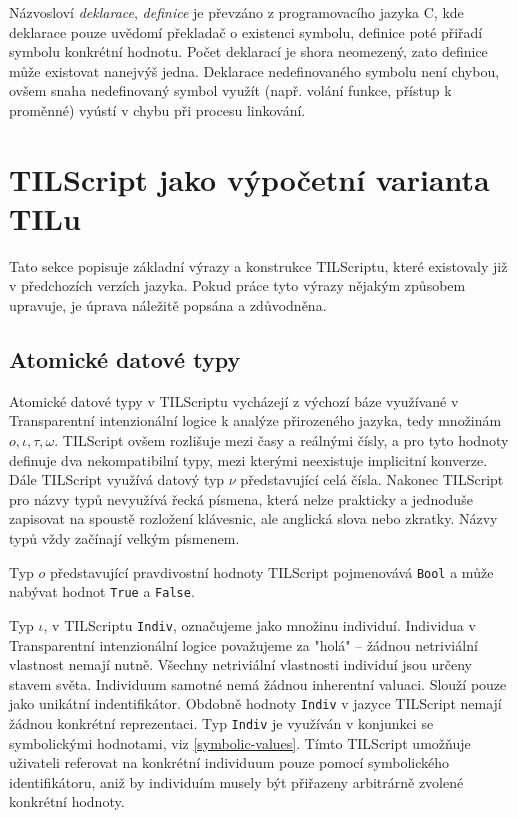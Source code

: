 Názvosloví \textit{deklarace}, \textit{definice} je převzáno z programovacího jazyka C, kde
deklarace pouze uvědomí překladač o existenci symbolu, definice poté přiřadí symbolu konkrétní
hodnotu. Počet deklarací je shora neomezený, zato definice může existovat nanejvýš jedna. Deklarace
nedefinovaného symbolu není chybou, ovšem snaha nedefinovaný symbol využít (např. volání funkce,
přístup k proměnné) vyústí v chybu při procesu linkování.

\section{TILScript jako výpočetní varianta TILu}

Tato sekce popisuje základní výrazy a konstrukce TILScriptu, které existovaly již v předchozích
verzích jazyka. Pokud práce tyto výrazy nějakým způsobem upravuje, je úprava náležitě popsána
a zdůvodněna.

\subsection{Atomické datové typy}

Atomické datové typy v TILScriptu vycházejí z výchozí báze využívané v Transparentní intenzionální
logice k analýze přirozeného jazyka, tedy množinám ${o, \iota, \tau, \omega}$. TILScript ovšem
rozlišuje mezi časy a reálnými čísly, a pro tyto hodnoty definuje dva nekompatibilní typy, mezi
kterými neexistuje implicitní konverze. Dále TILScript využívá datový typ $\nu$ představující celá
čísla. Nakonec TILScript pro názvy typů nevyužívá řecká písmena, která nelze prakticky a jednoduše
zapisovat na spoustě rozložení klávesnic, ale anglická slova nebo zkratky. Názvy typů vždy začínají
velkým písmenem.

Typ $o$ představující pravdivostní hodnoty TILScript pojmenovává \lstinline{Bool} a může nabývat
hodnot \lstinline{True} a \lstinline{False}.

Typ $\iota$, v TILScriptu \lstinline{Indiv}, označujeme jako množinu individuí. Individua
v Transparentní intenzionální logice považujeme za "holá" -- žádnou netriviální vlastnost nemají
nutně. Všechny netriviální vlastnosti individuí jsou určeny stavem světa. Individuum samotné nemá
žádnou inherentní valuaci. Slouží pouze jako unikátní indentifikátor. Obdobně hodnoty
\lstinline{Indiv} v jazyce TILScript nemají žádnou konkrétní reprezentaci. Typ \lstinline{Indiv}
je využíván v konjunkci se symbolickými hodnotami, viz \ref{symbolic-values}. Tímto TILScript
umožňuje uživateli referovat na konkrétní individuum pouze pomocí symbolického identifikátoru,
aniž by individuím musely být přiřazeny arbitrárně zvolené konkrétní hodnoty.

